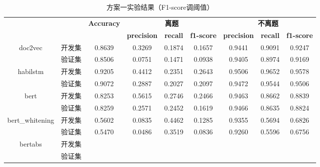 \documentclass[11pt]{article}
\begin{document}
\begin{CJK}{UTF8}{gkai}
\begin{table}[htbp]\small
  \centering
  \begin{tabular}{cc|ccccccc}
    \hline
    \multicolumn{2}{c}{\multirow{2}[0]{*}{\textcolor[rgb]{ 1,  0,  0}{}}} & \multirow{2}[0]{*}{\textbf{Accuracy}} & \multicolumn{3}{c}{\textbf{离题}} & \multicolumn{3}{c}{\textbf{不离题}} \\
    \multicolumn{2}{c}{} &       & \textbf{precision} & \textbf{recall} & \textbf{f1-score} & \textbf{precision} & \textbf{recall} & \textbf{f1-score} \\
    \hline
    \multirow{2}[0]{*}{doc2vec} & 开发集   & 0.8639  & 0.3269  & 0.1874  & 0.1657  & 0.9441  & 0.9091  & 0.9247  \\
    & 验证集   & 0.8506  & 0.0751  & 0.1471  & 0.0938  & 0.9405  & 0.8974  & 0.9169  \\
    \hline
    \multirow{2}[0]{*}{habilstm} & 开发集   & 0.9205  & 0.4412  & 0.2351  & 0.2643  & 0.9506  & 0.9652  & 0.9578  \\
    & 验证集   & 0.9072  & 0.2887  & 0.2027  & 0.2097  & 0.9472  & 0.9544  & 0.9506  \\
    \hline
    \multirow{2}[0]{*}{bert} & 开发集   & 0.8253  & 0.5615  & 0.2746  & 0.2466  & 0.9463  & 0.8662  & 0.8839  \\
    & 验证集   & 0.8259  & 0.2571  & 0.2452  & 0.1619  & 0.9466  & 0.8635  & 0.8824  \\
    \hline
    \multirow{2}[0]{*}{bert\_whitening} & 开发集   & 0.5602  & 0.0835  & 0.4462  & 0.1285  & 0.9355  & 0.5694  & 0.6826  \\
    & 验证集   & 0.5470  & 0.0486  & 0.3519  & 0.0836  & 0.9260  & 0.5596  & 0.6756  \\
    \hline
    \multirow{2}[0]{*}{bertabs} & 开发集   &       &       &       &       &       &       &  \\
    & 验证集   &       &       &       &       &       &       &  \\
    \hline
        \end{tabular}%
        \caption{方案一实验结果（F1-score调阈值）}
  \label{tab:addlabel}%
\end{table}%


\end{CJK}
\end{document}
